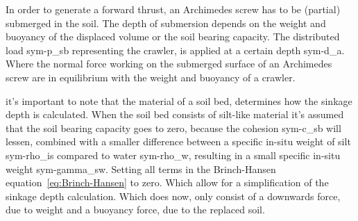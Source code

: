 In order to generate a forward thrust, an Archimedes screw has to be (partial) submerged in the soil. The depth of
submersion depends on the weight and buoyancy of the displaced volume or the soil bearing capacity. The distributed load
\gls{sym-p_sb} representing the crawler, is applied at a certain depth \gls{sym-d_a}. Where the normal force working on
the submerged surface of an Archimedes screw are in equilibrium with the weight and buoyancy of a crawler.

it's important to note that the material of a soil bed, determines how the sinkage depth is calculated. When the soil
bed consists of silt-like material it's assumed that the soil bearing capacity goes to zero, because the cohesion
\gls{sym-c_sb} will lessen, combined with a smaller difference between a specific in-situ weight of silt
\gls{sym-rho_is} compared to water \gls{sym-rho_w}, resulting in a small specific in-situ weight \gls{sym-gamma_sw}.
Setting all terms in the Brinch-Hansen equation~\ref{eq:Brinch-Hansen} to zero. Which allow for a simplification of the
sinkage depth calculation. Which does now, only consist of a downwards force, due to weight and a buoyancy force, due to
the replaced soil.

